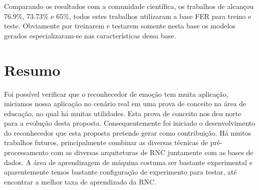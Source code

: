Comparando os resultados com a comunidade científica, os trabalhos de \cite{huang2016deep} alcançou 76.9\%, \cite{kim2016fusing} 73.73\% e \cite{art5} 65\%, todos estes trabalhos utilizaram a base FER para treino e teste. Obviamente por treinarem e testarem somente nesta base os modelos gerados especializaram-se nas características dessa base. 


\section{Resumo}\label{sec:considera}
Foi possível verificar que o reconhecedor de emoção tem muita aplicação, iniciamos nossa aplicação no cenário real em uma prova de conceito na área de educação, no qual há muitas utilidades. Esta prova de conceito nos deu norte para a evolução desta proposta. Consequentemente foi iniciado o desenvolvimento do reconhecedor que esta proposta pretende gerar como contribuição. Há muitos trabalhos futuros, principalmente combinar as diversas técnicas de pré-processamento com as diversas arquiteturas de RNC juntamente com as bases de dados. A área de aprendizagem de máquina costuma ser bastante experimental e aparentemente temos bastante configuração de experimento para testar, até encontrar a melhor taxa de aprendizado da RNC.